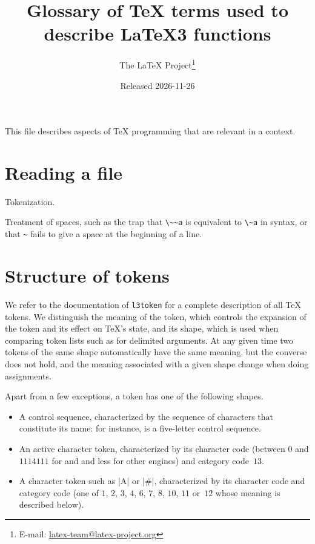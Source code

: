 \documentclass{l3doc}
\title{%
  Glossary of \TeX{} terms used to describe \LaTeX3 functions%
}
\author{%
  The \LaTeX{} Project\thanks
    {%
      E-mail:
      \href{mailto:latex-team@latex-project.org}%
        {latex-team@latex-project.org}%
    }%
}
\date{Released 2026-11-26}
\begin{document}
\maketitle

This file describes aspects of \TeX{} programming that are relevant in a
 context.

\section{Reading a file}

Tokenization.

Treatment of spaces, such as the trap that \verb|\~~a| is equivalent to
\verb|\~a| in  syntax, or that \verb|~| fails to give a space at the
beginning of a line.

\section{Structure of tokens}

We refer to the documentation of \texttt{l3token} for a complete
description of all \TeX{} tokens.  We distinguish the meaning of the
token, which controls the expansion of the token and its effect on
\TeX{}'s state, and its shape, which is used when comparing token lists
such as for delimited arguments.  At any given time two tokens of the
same shape automatically have the same meaning, but the converse does
not hold, and the meaning associated with a given shape change when
doing assignments.

Apart from a few exceptions, a token has one of the following shapes.
\begin{itemize}
  \item A control sequence, characterized by the sequence of characters
    that constitute its name: for instance,  is a five-letter
    control sequence.
  \item An active character token, characterized by its character code
    (between $0$ and $1114111$ for \LuaTeX{} and \XeTeX{} and less for
    other engines) and category code~$13$.
  \item A character token such as |A| or |#|, characterized by its
    character code and category code (one of $1$, $2$, $3$, $4$, $6$,
    $7$, $8$, $10$, $11$ or~$12$ whose meaning is described below).
\end{itemize}
\end{document}
